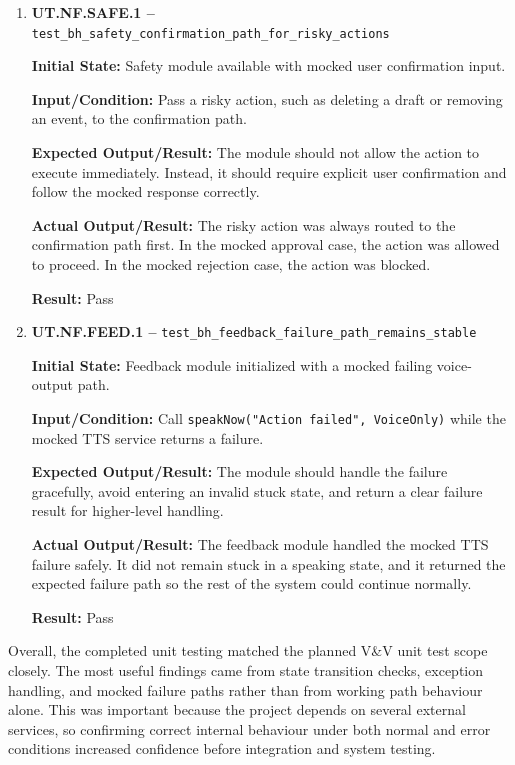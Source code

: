 \documentclass[12pt]{article}
\begin{document}
\begin{enumerate}
    \item \textbf{UT.NF.SAFE.1 --}
    \texttt{test\_bh\_safety\_confirmation\_path\_for\_risky\_actions}
    
    \textbf{Initial State:} Safety module available with mocked user
    confirmation input.
    
    \textbf{Input/Condition:} Pass a risky action, such as deleting a
    draft or removing an event, to the confirmation path.
    
    \textbf{Expected Output/Result:} The module should not allow the
    action to execute immediately. Instead, it should require explicit
    user confirmation and follow the mocked response correctly.
    
    \textbf{Actual Output/Result:} The risky action was always routed
    to the confirmation path first. In the mocked approval case, the
    action was allowed to proceed. In the mocked rejection case, the
    action was blocked.
    
    \textbf{Result:} Pass
    
    \item \textbf{UT.NF.FEED.1 --}
    \texttt{test\_bh\_feedback\_failure\_path\_remains\_stable}
    
    \textbf{Initial State:} Feedback module initialized with a mocked
    failing voice-output path.
    
    \textbf{Input/Condition:} Call
    \texttt{speakNow("Action failed", VoiceOnly)} while the mocked TTS
    service returns a failure.
    
    \textbf{Expected Output/Result:} The module should handle the
    failure gracefully, avoid entering an invalid stuck state, and
    return a clear failure result for higher-level handling.
    
    \textbf{Actual Output/Result:} The feedback module handled the
    mocked TTS failure safely. It did not remain stuck in a speaking
    state, and it returned the expected failure path so the rest of the
    system could continue normally.
    
    \textbf{Result:} Pass
\end{enumerate}

Overall, the completed unit testing matched the planned V\&V unit test
scope closely. The most useful findings came from state transition
checks, exception handling, and mocked failure paths rather than from
working path behaviour alone. This was important because the project
depends on several external services, so confirming correct internal
behaviour under both normal and error conditions increased confidence
before integration and system testing.
\end{document}
